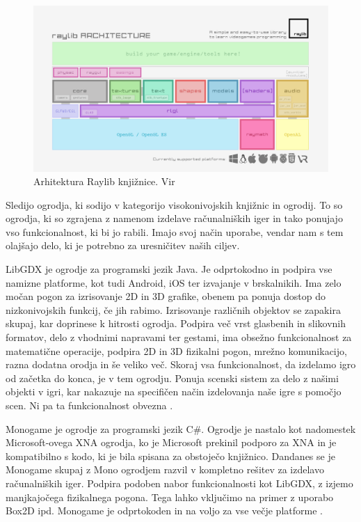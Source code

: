 \documentclass[12pt,a4paper,twoside]{book}
\begin{document}
\begin{figure}[h]
	\centering
	\includegraphics[width=12cm]{raylib_architecture}
	\caption{Arhitektura Raylib knjižnice. Vir \cite{raylib}}
	\label{slika:raylib}
\end{figure}

Sledijo ogrodja, ki sodijo v kategorijo visokonivojskih knjižnic in ogrodij. To so ogrodja, ki so zgrajena z namenom izdelave računalniških iger in tako ponujajo vso funkcionalnost, ki bi jo rabili. Imajo svoj način uporabe, vendar nam s tem olajšajo delo, ki je potrebno za uresničitev naših ciljev.

LibGDX je ogrodje za programski jezik Java. Je odprtokodno in podpira vse namizne platforme, kot tudi Android, iOS ter izvajanje v brskalnikih. Ima zelo močan pogon za izrisovanje 2D in 3D grafike, obenem pa ponuja dostop do nizkonivojskih funkcij, če jih rabimo. Izrisovanje različnih objektov se zapakira skupaj, kar doprinese k hitrosti ogrodja. Podpira več vrst glasbenih in slikovnih formatov, delo z vhodnimi napravami ter gestami, ima obsežno funkcionalnost za matematične operacije, podpira 2D in 3D fizikalni pogon, mrežno komunikacijo, razna dodatna orodja in še veliko več. Skoraj vsa funkcionalnost, da izdelamo igro od začetka do konca, je v tem ogrodju. Ponuja scenski sistem za delo z našimi objekti v igri, kar nakazuje na specifičen način izdelovanja naše igre s pomočjo scen. Ni pa ta funkcionalnost obvezna \cite{libgdx}.

Monogame je ogrodje za programski jezik C\#. Ogrodje je nastalo kot nadomestek Microsoft-ovega XNA ogrodja, ko je Microsoft prekinil podporo za XNA in je kompatibilno s kodo, ki je bila spisana za obstoječo knjižnico. Dandanes se je Monogame skupaj z Mono ogrodjem razvil v kompletno rešitev za izdelavo računalniških iger. Podpira podoben nabor funkcionalnosti kot LibGDX, z izjemo manjkajočega fizikalnega pogona. Tega lahko vključimo na primer z uporabo Box2D ipd. Monogame je odprtokoden in na voljo za vse večje platforme \cite{monogame}.
\end{document}
